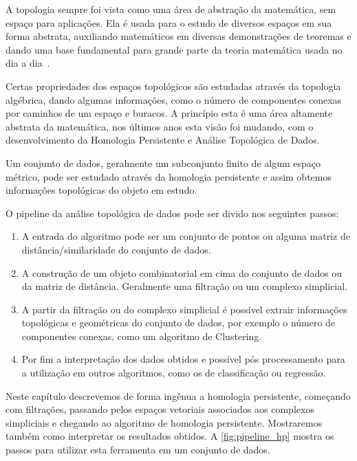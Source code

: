 A topologia sempre foi vista como uma área de abstração da matemática, sem
espaço para aplicações. Ela é usada para o estudo de diversos espaços
em sua forma abstrata, auxiliando matemáticos em diversas demonstrações
de teoremas e dando uma base fundamental para grande parte da teoria matemática
usada no dia a dia~\cite{Poincare1895}.

Certas propriedades dos espaços topológicos são estudadas através da
topologia algébrica, dando algumas informações, como o número de componentes
conexas por caminhos de um espaço e buracos. A princípio esta é uma área altamente
abstrata da matemática,  nos últimos anos esta visão foi mudando,
com o desenvolvimento da Homologia Persistente e Análise Topológica de Dados.

Um conjunto de dados, geralmente um subconjunto finito de algum espaço métrico,
pode ser estudado através da homologia persistente e assim obtemos informações
topológicas do objeto em estudo.

O pipeline da análise topológica de dados pode ser divido nos seguintes passos:
\begin{enumerate}
  \item A entrada do algoritmo pode ser um conjunto de pontos ou alguma matriz
  de distância/similaridade do conjunto de dados.
  \item A construção de um objeto combinatorial em cima do conjunto de dados ou
  da matriz de distância. Geralmente uma filtração ou um complexo simplicial.
  \item A partir da filtração ou do complexo simplicial é possível extrair informações
  topológicas e geométricas do conjunto de dados, por exemplo o número de
  componentes conexas, como um algoritmo de Clustering.
  \item Por fim a interpretação dos dados obtidos e possível pós processamento
  para a utilização em outros algoritmos, como os de classificação ou regressão.
\end{enumerate}

Neste capítulo descrevemos de forma ingênua a homologia persistente, começando com
filtrações, passando pelos espaços vetoriais associados
aos complexos simpliciais e chegando ao algoritmo de homologia persistente.
Mostraremos também como interpretar os resultados obtidos.
A \autoref{fig:pipeline_hp} mostra os passos para utilizar esta ferramenta em um conjunto de dados.

